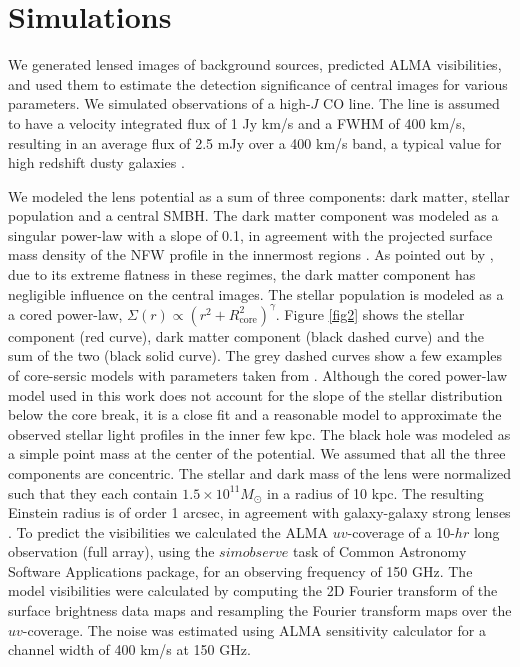 \documentclass[chicago]{emulateapj}
\begin{document}
\section{Simulations}
We generated lensed images of background sources, predicted ALMA visibilities, and used them to estimate the detection significance of central images for various parameters. We simulated observations of a high-$J$ CO line. The line is assumed to have a velocity integrated flux of 1 Jy km/s and a FWHM of 400 km/s, resulting in an average flux of 2.5 mJy over a 400 km/s band, a typical value for high redshift dusty galaxies \citep{Bothwell:12}. 

We modeled the lens potential as a sum of three components: dark matter, stellar population and a central SMBH. The dark matter component was modeled as a singular power-law with a slope of 0.1, in agreement with the projected surface mass density of the NFW profile in the innermost regions \citep{Golse:02}. As  pointed out by \citet{Keeton:03}, due to its extreme flatness in these regimes, the dark matter component has negligible influence on the central images. 
The stellar population is modeled as a a cored power-law, $\Sigma(r)\propto (r^2+R_{\mathrm{core}}^2)^{\gamma}$. Figure \ref{fig2} shows the stellar component (red curve), dark matter component (black dashed curve) and the sum of the two (black solid curve). The grey dashed curves show a few examples of core-sersic models with parameters taken from \citet{Ferrarese:06}. Although the cored power-law model used in this work does not account for the slope of the stellar distribution below the core break, it is a close fit and a reasonable model to approximate the observed stellar light profiles in the inner few kpc. 
The black hole was modeled as a simple point mass at the center of the potential. We assumed that all the three components are concentric.
The stellar and dark mass of the lens were normalized such that they each contain $1.5\times10^{11} M_{\odot}$ in a radius of 10 kpc. The resulting Einstein radius is of order 1 arcsec, in agreement with galaxy-galaxy strong lenses \citep[e.g.,][]{}.
To predict the visibilities we calculated the ALMA $uv$-coverage of a 10-$hr$ long observation (full array), using the $simobserve$ task of Common Astronomy Software Applications package, for an observing frequency of 150 GHz. 
The model visibilities were calculated by computing the 2D Fourier transform of the surface brightness data maps and resampling the Fourier transform maps over the $uv$-coverage. 
The noise was estimated using ALMA sensitivity calculator for a channel width of 400 km/s at 150 GHz. 
\end{document}
